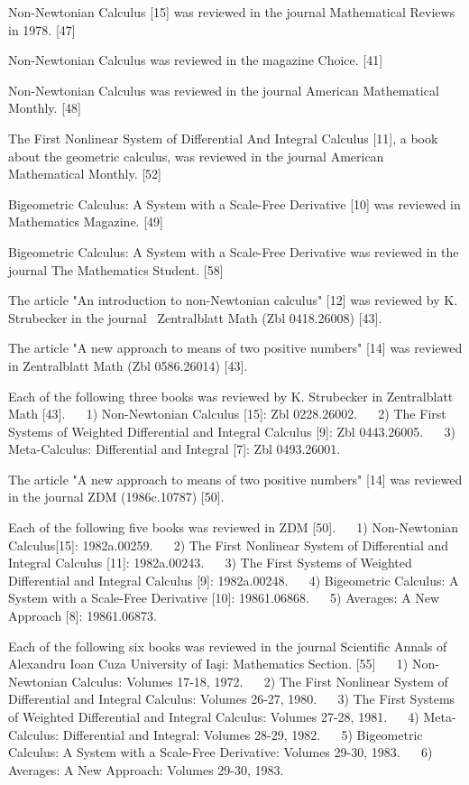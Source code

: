 \documentclass[12pt]{article}
\begin{document}
Non-Newtonian Calculus [15] was reviewed in the journal Mathematical Reviews in 1978. [47]

Non-Newtonian Calculus was reviewed in the magazine Choice. [41]

Non-Newtonian Calculus was reviewed in the journal American Mathematical Monthly. [48]

The First Nonlinear System of Differential And Integral Calculus [11], a book about the geometric calculus, was reviewed in the journal American Mathematical Monthly. [52]

Bigeometric Calculus: A System with a Scale-Free Derivative [10] was reviewed in Mathematics Magazine. [49]

Bigeometric Calculus: A System with a Scale-Free Derivative was reviewed in the journal The Mathematics Student. [58]

The article "An introduction to non-Newtonian calculus" [12] was reviewed by K. Strubecker in the journal  Zentralblatt Math (Zbl 0418.26008) [43].

The article "A new approach to means of two positive numbers" [14] was reviewed in Zentralblatt Math (Zbl 0586.26014) [43].

Each of the following three books was reviewed by K. Strubecker in Zentralblatt Math [43].
   1) Non-Newtonian Calculus [15]: Zbl 0228.26002.
   2) The First Systems of Weighted Differential and Integral Calculus [9]: Zbl 0443.26005.
   3) Meta-Calculus: Differential and Integral [7]: Zbl 0493.26001.

The article "A new approach to means of two positive numbers" [14] was reviewed in the journal ZDM (1986c.10787) [50].

Each of the following five books was reviewed in ZDM [50].
   1) Non-Newtonian Calculus[15]: 1982a.00259.
   2) The First Nonlinear System of Differential and Integral Calculus [11]: 1982a.00243.
   3) The First Systems of Weighted Differential and Integral Calculus [9]: 1982a.00248.
   4) Bigeometric Calculus: A System with a Scale-Free Derivative [10]: 19861.06868.
   5) Averages: A New Approach [8]: 19861.06873.

Each of the following six books was reviewed in the journal Scientific Annals of Alexandru Ioan Cuza University of Iaşi: Mathematics Section. [55]
   1) Non-Newtonian Calculus: Volumes 17-18, 1972.
   2) The First Nonlinear System of Differential and Integral Calculus: Volumes 26-27, 1980.
   3) The First Systems of Weighted Differential and Integral Calculus: Volumes 27-28, 1981.
   4) Meta-Calculus: Differential and Integral: Volumes 28-29, 1982.
   5) Bigeometric Calculus: A System with a Scale-Free Derivative: Volumes 29-30, 1983.
   6) Averages: A New Approach: Volumes 29-30, 1983. 
\end{document}
